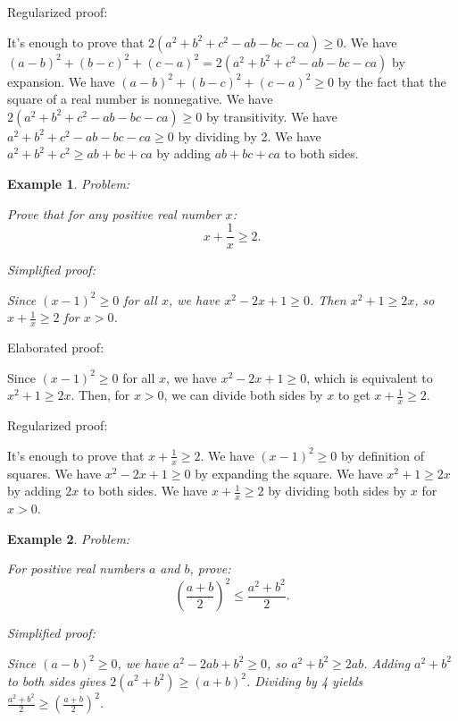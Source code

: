 \documentclass{article}
\newtheorem{example}{Example}
\begin{document}
Regularized proof:
\begin{tcolorbox}[colback=red!10, width=\linewidth]
It's enough to prove that $2(a^2+b^2+c^2-ab-bc-ca) \ge 0$. We have $(a-b)^2+(b-c)^2+(c-a)^2 = 2(a^2+b^2+c^2-ab-bc-ca)$ by expansion. We have $(a-b)^2+(b-c)^2+(c-a)^2 \ge 0$ by the fact that the square of a real number is nonnegative. We have $2(a^2+b^2+c^2-ab-bc-ca) \ge 0$ by transitivity. We have $a^2+b^2+c^2-ab-bc-ca \ge 0$ by dividing by 2. We have $a^2+b^2+c^2 \ge ab+bc+ca$ by adding $ab+bc+ca$ to both sides.
\end{tcolorbox}



\begin{example}
Problem:
\begin{tcolorbox}[colback=yellow!10, width=\linewidth]
Prove that for any positive real number $x$:
    $$x + \frac{1}{x} \geq 2.$$
\end{tcolorbox}

Simplified proof:
\begin{tcolorbox}[colback=blue!10, width=\linewidth]
Since $(x-1)^2 \ge 0$ for all $x$, we have $x^2 - 2x + 1 \ge 0$. Then $x^2 + 1 \ge 2x$, so $x + \frac{1}{x} \ge 2$ for $x>0$.
\end{tcolorbox}
\end{example}

Elaborated proof:
\begin{tcolorbox}[colback=green!10, width=\linewidth]
Since $(x-1)^2 \ge 0$ for all $x$, we have $x^2 - 2x + 1 \ge 0$, which is equivalent to $x^2 + 1 \ge 2x$.  Then, for $x>0$, we can divide both sides by $x$ to get $x + \frac{1}{x} \ge 2$.
\end{tcolorbox}

Regularized proof:
\begin{tcolorbox}[colback=red!10, width=\linewidth]
It's enough to prove that $x + \frac{1}{x} \geq 2$. We have $(x-1)^2 \ge 0$ by definition of squares. We have $x^2 - 2x + 1 \ge 0$ by expanding the square. We have $x^2 + 1 \ge 2x$ by adding $2x$ to both sides. We have $x + \frac{1}{x} \ge 2$ by dividing both sides by $x$ for $x>0$.
\end{tcolorbox}



\begin{example}
Problem:
\begin{tcolorbox}[colback=yellow!10, width=\linewidth]
For positive real numbers $a$ and $b$, prove:
    $$\left(\frac{a+b}{2}\right)^2 \leq \frac{a^2+b^2}{2}.$$
\end{tcolorbox}

Simplified proof:
\begin{tcolorbox}[colback=blue!10, width=\linewidth]
Since $(a-b)^2 \ge 0$, we have $a^2 - 2ab + b^2 \ge 0$, so $a^2 + b^2 \ge 2ab$.  Adding $a^2 + b^2$ to both sides gives $2(a^2+b^2) \ge (a+b)^2$. Dividing by 4 yields $\frac{a^2+b^2}{2} \ge \left(\frac{a+b}{2}\right)^2$.
\end{tcolorbox}
\end{example}
\end{document}
